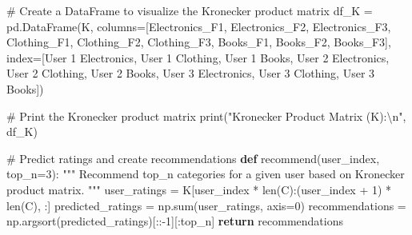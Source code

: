 \documentclass[
  letterpaper,
  DIV=11,
  numbers=noendperiod]{scrreprt}
\newenvironment{Shaded}{\begin{snugshade}}{\end{snugshade}}
\newcommand{\BuiltInTok}[1]{\textcolor[rgb]{0.00,0.23,0.31}{#1}}
\newcommand{\CharTok}[1]{\textcolor[rgb]{0.13,0.47,0.30}{#1}}
\newcommand{\CommentTok}[1]{\textcolor[rgb]{0.37,0.37,0.37}{#1}}
\newcommand{\ControlFlowTok}[1]{\textcolor[rgb]{0.00,0.23,0.31}{\textbf{#1}}}
\newcommand{\DecValTok}[1]{\textcolor[rgb]{0.68,0.00,0.00}{#1}}
\newcommand{\KeywordTok}[1]{\textcolor[rgb]{0.00,0.23,0.31}{\textbf{#1}}}
\newcommand{\NormalTok}[1]{\textcolor[rgb]{0.00,0.23,0.31}{#1}}
\newcommand{\OperatorTok}[1]{\textcolor[rgb]{0.37,0.37,0.37}{#1}}
\newcommand{\StringTok}[1]{\textcolor[rgb]{0.13,0.47,0.30}{#1}}
\theoremstyle{plain}
\theoremstyle{definition}
\theoremstyle{remark}
\begin{document}
\begin{tcolorbox}
\begin{Shaded}
\begin{Highlighting}[]
\CommentTok{\# Create a DataFrame to visualize the Kronecker product matrix}
\NormalTok{df\_K }\OperatorTok{=}\NormalTok{ pd.DataFrame(K, }
\NormalTok{                    columns}\OperatorTok{=}\NormalTok{[}\StringTok{\textquotesingle{}Electronics\_F1\textquotesingle{}}\NormalTok{, }\StringTok{\textquotesingle{}Electronics\_F2\textquotesingle{}}\NormalTok{, }\StringTok{\textquotesingle{}Electronics\_F3\textquotesingle{}}\NormalTok{, }
                             \StringTok{\textquotesingle{}Clothing\_F1\textquotesingle{}}\NormalTok{, }\StringTok{\textquotesingle{}Clothing\_F2\textquotesingle{}}\NormalTok{, }\StringTok{\textquotesingle{}Clothing\_F3\textquotesingle{}}\NormalTok{, }
                             \StringTok{\textquotesingle{}Books\_F1\textquotesingle{}}\NormalTok{, }\StringTok{\textquotesingle{}Books\_F2\textquotesingle{}}\NormalTok{, }\StringTok{\textquotesingle{}Books\_F3\textquotesingle{}}\NormalTok{],}
\NormalTok{                    index}\OperatorTok{=}\NormalTok{[}\StringTok{\textquotesingle{}User 1 Electronics\textquotesingle{}}\NormalTok{, }\StringTok{\textquotesingle{}User 1 Clothing\textquotesingle{}}\NormalTok{, }\StringTok{\textquotesingle{}User 1 Books\textquotesingle{}}\NormalTok{, }
                           \StringTok{\textquotesingle{}User 2 Electronics\textquotesingle{}}\NormalTok{, }\StringTok{\textquotesingle{}User 2 Clothing\textquotesingle{}}\NormalTok{, }\StringTok{\textquotesingle{}User 2 Books\textquotesingle{}}\NormalTok{, }
                           \StringTok{\textquotesingle{}User 3 Electronics\textquotesingle{}}\NormalTok{, }\StringTok{\textquotesingle{}User 3 Clothing\textquotesingle{}}\NormalTok{, }\StringTok{\textquotesingle{}User 3 Books\textquotesingle{}}\NormalTok{])}

\CommentTok{\# Print the Kronecker product matrix}
\BuiltInTok{print}\NormalTok{(}\StringTok{"Kronecker Product Matrix (K):}\CharTok{\textbackslash{}n}\StringTok{"}\NormalTok{, df\_K)}

\CommentTok{\# Predict ratings and create recommendations}
\KeywordTok{def}\NormalTok{ recommend(user\_index, top\_n}\OperatorTok{=}\DecValTok{3}\NormalTok{):}
    \CommentTok{""" Recommend top\_n categories for a given user based on Kronecker product matrix. """}
\NormalTok{    user\_ratings }\OperatorTok{=}\NormalTok{ K[user\_index }\OperatorTok{*} \BuiltInTok{len}\NormalTok{(C):(user\_index }\OperatorTok{+} \DecValTok{1}\NormalTok{) }\OperatorTok{*} \BuiltInTok{len}\NormalTok{(C), :]}
\NormalTok{    predicted\_ratings }\OperatorTok{=}\NormalTok{ np.}\BuiltInTok{sum}\NormalTok{(user\_ratings, axis}\OperatorTok{=}\DecValTok{0}\NormalTok{)}
\NormalTok{    recommendations }\OperatorTok{=}\NormalTok{ np.argsort(predicted\_ratings)[::}\OperatorTok{{-}}\DecValTok{1}\NormalTok{][:top\_n]}
    \ControlFlowTok{return}\NormalTok{ recommendations}


\end{Highlighting}
\end{Shaded}
\end{tcolorbox}
\end{document}
